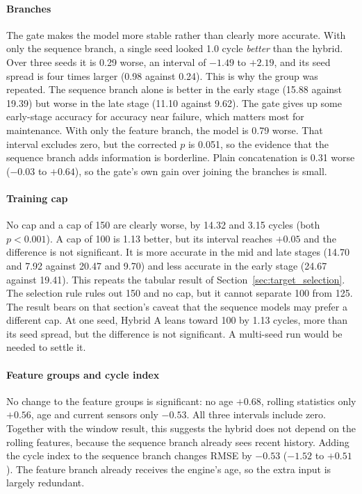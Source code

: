\paragraph{Branches}
The gate makes the model more stable rather than clearly more accurate.
With only the sequence branch, a single seed looked 1.0 cycle \emph{better}
than the hybrid. Over three seeds it is 0.29 worse, an interval of $-1.49$
to $+2.19$, and its seed spread is four times larger (0.98 against 0.24).
This is why the group was repeated. The sequence branch alone is better in
the early stage (15.88 against 19.39) but worse in the late stage (11.10
against 9.62). The gate gives up some early-stage accuracy for accuracy near
failure, which matters most for maintenance. With only the feature branch,
the model is 0.79 worse. That interval excludes zero, but the corrected
$p$ is 0.051, so the evidence that the sequence branch adds information is
borderline. Plain concatenation is 0.31 worse ($-0.03$ to $+0.64$), so the
gate's own gain over joining the branches is small.

\paragraph{Training cap}
No cap and a cap of 150 are clearly worse, by 14.32 and 3.15 cycles (both
$p<0.001$). A cap of 100 is 1.13 better, but its interval reaches $+0.05$
and the difference is not significant. It is more accurate in the mid and
late stages (14.70 and 7.92 against 20.47 and 9.70) and less accurate in
the early stage (24.67 against 19.41). This repeats the tabular result of
Section~\ref{sec:target_selection}. The selection rule rules out 150 and no
cap, but it cannot separate 100 from 125. The result bears on that
section's caveat that the sequence models may prefer a different cap. At one
seed, Hybrid A leans toward 100 by 1.13 cycles, more than its seed spread,
but the difference is not significant. A multi-seed run would be needed to
settle it.

\paragraph{Feature groups and cycle index}
No change to the feature groups is significant: no age $+0.68$, rolling
statistics only $+0.56$, age and current sensors only $-0.53$. All three
intervals include zero. Together with the window result, this suggests the
hybrid does not depend on the rolling features, because the sequence branch
already sees recent history. Adding the cycle index to the sequence branch
changes RMSE by $-0.53$ ($-1.52$ to $+0.51$). The feature branch already
receives the engine's age, so the extra input is largely redundant.

